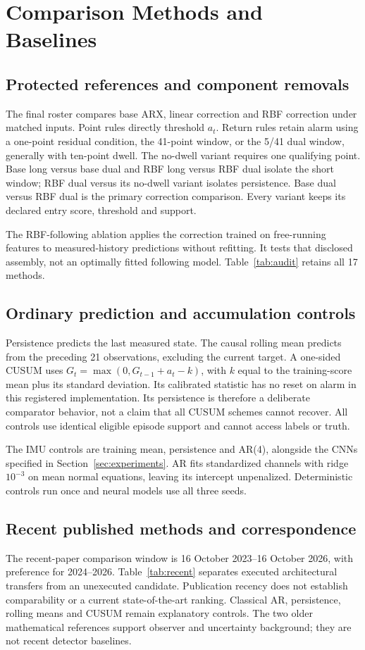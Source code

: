 \section{Comparison Methods and Baselines}\label{sec:comparators}
\subsection{Protected references and component removals}
The final roster compares base ARX, linear correction and RBF correction under matched inputs. Point rules directly threshold $a_t$. Return rules retain alarm using a one-point residual condition, the 41-point window, or the 5/41 dual window, generally with ten-point dwell. The no-dwell variant requires one qualifying point. Base long versus base dual and RBF long versus RBF dual isolate the short window; RBF dual versus its no-dwell variant isolates persistence. Base dual versus RBF dual is the primary correction comparison. Every variant keeps its declared entry score, threshold and support.

The RBF-following ablation applies the correction trained on free-running features to measured-history predictions without refitting. It tests that disclosed assembly, not an optimally fitted following model. Table~\ref{tab:audit} retains all 17 methods.

\subsection{Ordinary prediction and accumulation controls}
Persistence predicts the last measured state. The causal rolling mean predicts from the preceding 21 observations, excluding the current target. A one-sided CUSUM uses $G_t=\max(0,G_{t-1}+a_t-k)$, with $k$ equal to the training-score mean plus its standard deviation. Its calibrated statistic has no reset on alarm in this registered implementation. Its persistence is therefore a deliberate comparator behavior, not a claim that all CUSUM schemes cannot recover. All controls use identical eligible episode support and cannot access labels or truth.

The IMU controls are training mean, persistence and AR(4), alongside the CNNs specified in Section~\ref{sec:experiments}. AR fits standardized channels with ridge $10^{-3}$ on mean normal equations, leaving its intercept unpenalized. Deterministic controls run once and neural models use all three seeds.

\subsection{Recent published methods and correspondence}
The recent-paper comparison window is 16 October 2023--16 October 2026, with preference for 2024--2026. Table~\ref{tab:recent} separates executed architectural transfers from an unexecuted candidate. Publication recency does not establish comparability or a current state-of-the-art ranking. Classical AR, persistence, rolling means and CUSUM remain explanatory controls. The two older mathematical references support observer and uncertainty background; they are not recent detector baselines.

